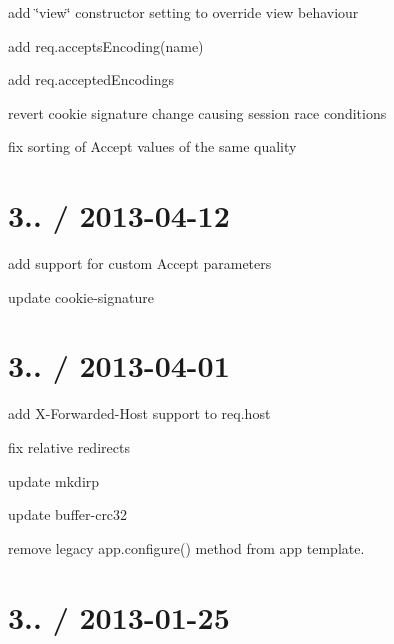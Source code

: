 {\ttfamily }

{\ttfamily 
\begin{DoxyItemize}
\item add \char`\"{}view\char`\"{} constructor setting to override view behaviour
\item add req.\+accepts\+Encoding(name)
\item add req.\+accepted\+Encodings
\item revert cookie signature change causing session race conditions
\item fix sorting of Accept values of the same quality
\end{DoxyItemize}}

{\ttfamily \section*{3.. / 2013-\/04-\/12 }}

{\ttfamily }

{\ttfamily 
\begin{DoxyItemize}
\item add support for custom Accept parameters
\item update cookie-\/signature
\end{DoxyItemize}}

{\ttfamily \section*{3.. / 2013-\/04-\/01 }}

{\ttfamily }

{\ttfamily 
\begin{DoxyItemize}
\item add X-\/\+Forwarded-\/\+Host support to {\ttfamily req.\+host}
\item fix relative redirects
\item update mkdirp
\item update buffer-\/crc32
\item remove legacy app.\+configure() method from app template.
\end{DoxyItemize}}

{\ttfamily \section*{3.. / 2013-\/01-\/25 }}

{\ttfamily }

